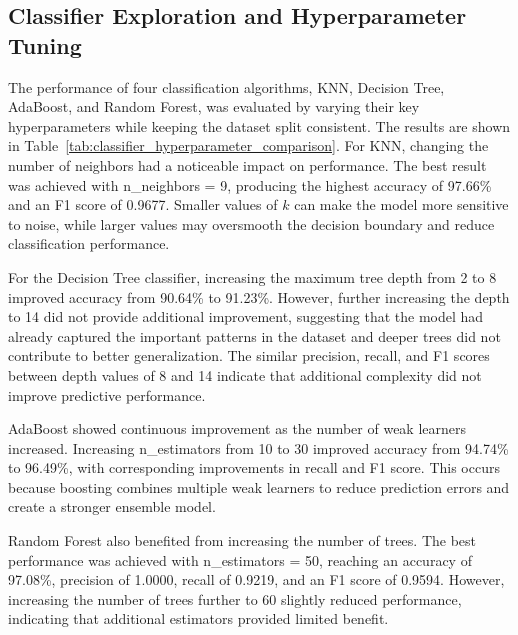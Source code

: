\documentclass[a4paper,12pt]{article}
\begin{document}
\subsection{Classifier Exploration and Hyperparameter Tuning}
The performance of four classification algorithms, KNN, Decision Tree, AdaBoost, and Random Forest, was evaluated by varying their key hyperparameters while keeping the dataset split consistent. The results are shown in Table~\ref{tab:classifier_hyperparameter_comparison}. For KNN, changing the number of neighbors had a noticeable impact on performance. The best result was achieved with n\_neighbors = 9, producing the highest accuracy of 97.66\% and an F1 score of 0.9677. Smaller values of $k$ can make the model more sensitive to noise, while larger values may oversmooth the decision boundary and reduce classification performance.

For the Decision Tree classifier, increasing the maximum tree depth from 2 to 8 improved accuracy from 90.64\% to 91.23\%. However, further increasing the depth to 14 did not provide additional improvement, suggesting that the model had already captured the important patterns in the dataset and deeper trees did not contribute to better generalization. The similar precision, recall, and F1 scores between depth values of 8 and 14 indicate that additional complexity did not improve predictive performance.

AdaBoost showed continuous improvement as the number of weak learners increased. Increasing n\_estimators from 10 to 30 improved accuracy from 94.74\% to 96.49\%, with corresponding improvements in recall and F1 score. This occurs because boosting combines multiple weak learners to reduce prediction errors and create a stronger ensemble model.

Random Forest also benefited from increasing the number of trees. The best performance was achieved with n\_estimators = 50, reaching an accuracy of 97.08\%, precision of 1.0000, recall of 0.9219, and an F1 score of 0.9594. However, increasing the number of trees further to 60 slightly reduced performance, indicating that additional estimators provided limited benefit.
\end{document}
